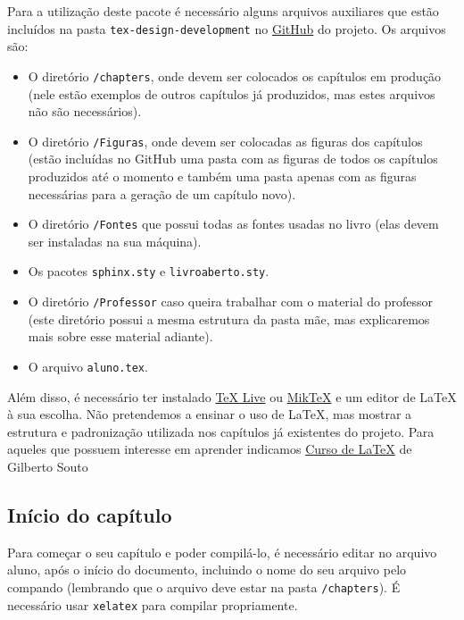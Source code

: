 \mainmatter




Para a utilização deste pacote é necessário alguns arquivos auxiliares que estão incluídos na pasta \verb|tex-design-development| no \href{https://github.com/livro-aberto/tex-design-development/}{GitHub} do projeto. Os arquivos são:
\begin{itemize}
\item O diretório \verb|/chapters|, onde devem ser colocados os capítulos em produção (nele estão exemplos de outros capítulos já produzidos, mas estes arquivos não são necessários).
\item O diretório \verb|/Figuras|, onde devem ser colocadas as figuras dos capítulos (estão incluídas no GitHub uma pasta com as figuras de todos os capítulos produzidos até o momento e também uma pasta apenas com as figuras necessárias para a geração de um capítulo novo).
\item O diretório \verb|/Fontes| que possui todas as fontes usadas no livro (elas devem ser instaladas na sua máquina).
\item Os pacotes \verb|sphinx.sty| e \verb|livroaberto.sty|.
\item O diretório \verb|/Professor| caso queira trabalhar com o material do professor (este diretório possui a mesma estrutura da pasta mãe, mas explicaremos mais sobre esse material adiante).
\item O arquivo \verb|aluno.tex|.
\end{itemize}

Além disso, é necessário ter instalado \href{https://www.tug.org/texlive/}{\TeX{} Live} ou \href{https://miktex.org/}{Mik\TeX}{} e um editor de \LaTeX{} à sua escolha. Não pretendemos a ensinar o uso de \LaTeX, mas mostrar a estrutura e padronização utilizada nos capítulos já existentes do projeto. Para aqueles que possuem interesse em aprender indicamos \href{http://www.uft.edu.br/engambiental/prof/catalunha/arquivos/latex/latex_GilbertoSouto.pdf}{Curso de \LaTeX{}} de Gilberto Souto %



\subsection{Início do capítulo}

Para começar o seu capítulo e poder compilá-lo, é necessário editar no arquivo aluno, após o início do documento, incluindo o nome do seu arquivo pelo compando \verb||(lembrando que o arquivo deve estar na pasta \verb|/chapters|). É necessário usar \verb|xelatex| para compilar propriamente.

